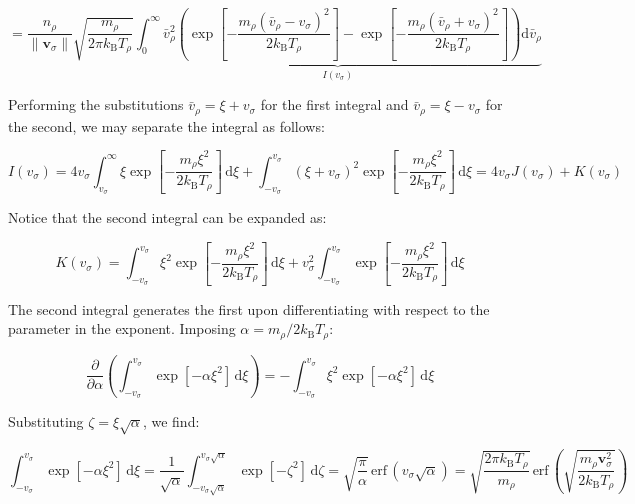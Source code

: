 \begin{equation}
    =\frac{n_\rho}{\|\mathbf{v}_\sigma\|}\sqrt{\frac{m_\rho}{2\pi k_\mathrm{B}T_\rho}}\underbrace{\int_0^\infty\bar{v}_\rho^2\left(\exp{\left[-\frac{m_\rho(\bar{v}_\rho-v_\sigma)^2}{2k_\mathrm{B}T_\rho}\right]}-\exp{\left[-\frac{m_\rho(\bar{v}_\rho+v_\sigma)^2}{2k_\mathrm{B}T_\rho}\right]}\right)\mathrm{d}\bar{v}_\rho}_{I(v_\sigma)}
\end{equation}

Performing the substitutions $\bar{v}_\rho=\xi+v_\sigma$ for the first integral and $\bar{v}_\rho=\xi-v_\sigma$ for the second, we may separate the integral as follows:

\begin{equation}
    I(v_\sigma)=4v_\sigma\int_{v_\sigma}^\infty\xi\exp{\left[-\frac{m_\rho\xi^2}{2k_\mathrm{B}T_\rho}\right]}\,\mathrm{d}\xi+\int_{-v_\sigma}^{v_\sigma}(\xi+v_\sigma)^2\exp{\left[-\frac{m_\rho\xi^2}{2k_\mathrm{B}T_\rho}\right]}\,\mathrm{d}\xi=4v_\sigma J(v_\sigma)+K(v_\sigma)
\end{equation}

Notice that the second integral can be expanded as:

\begin{equation}
    K(v_\sigma)=\int_{-v_\sigma}^{v_\sigma}\xi^2\exp{\left[-\frac{m_\rho\xi^2}{2k_\mathrm{B}T_\rho}\right]}\,\mathrm{d}\xi+v_\sigma^2\int_{-v_\sigma}^{v_\sigma}\exp{\left[-\frac{m_\rho\xi^2}{2k_\mathrm{B}T_\rho}\right]}\,\mathrm{d}\xi
\end{equation}

The second integral generates the first upon differentiating with respect to the parameter in the exponent. Imposing $\alpha=m_\rho/2k_\mathrm{B}T_\rho$:

\begin{equation}
    \frac{\partial}{\partial\alpha}\left(\int_{-v_\sigma}^{v_\sigma}\exp{\left[-\alpha\xi^2\right]}\,\mathrm{d}\xi\right)=-\int_{-v_\sigma}^{v_\sigma}\xi^2\exp{\left[-\alpha\xi^2\right]}\,\mathrm{d}\xi
\end{equation}

Substituting $\zeta=\xi\sqrt{\alpha}$, we find:

\begin{equation}
    \int_{-v_\sigma}^{v_\sigma}\exp{\left[-\alpha\xi^2\right]}\,\mathrm{d}\xi=\frac{1}{\sqrt{\alpha}}\int_{-v_\sigma\sqrt{\alpha}}^{v_\sigma\sqrt{\alpha}}\exp{[-\zeta^2]}\,\mathrm{d}\zeta=\sqrt{\frac{\pi}{\alpha}}\,\text{erf}\,(v_\sigma\sqrt{\alpha})=\sqrt{\frac{2\pi k_\mathrm{B}T_\rho}{m_\rho}}\,\text{erf}\,\left(\sqrt{\frac{m_\rho\mathbf{v}_\sigma^2}{2k_\mathrm{B}T_\rho}}\right)
\end{equation}

